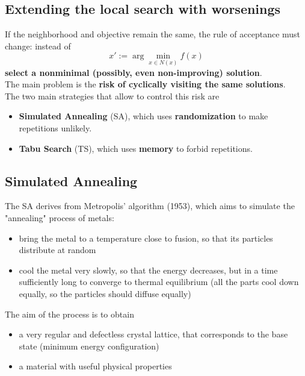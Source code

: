 \documentclass[11pt]{article}
\begin{document}
	
	\newpage
	
	\subsection{Extending the local search with worsenings}
	
	If the neighborhood and objective remain the same, the rule of acceptance must change: instead of
	$$ x' := \arg \min_{x\in N(x)} f (x) $$
	\textbf{select a nonminimal (possibly, even non-improving) solution}.\\
	
	The main problem is the \textbf{risk of cyclically visiting the same solutions}.\\
	
	The two main strategies that allow to control this risk are
	\begin{itemize}
		\item \textbf{Simulated Annealing} (SA), which uses \textbf{randomization} to make repetitions unlikely.\\
		
		\item \textbf{Tabu Search} (TS), which uses \textbf{memory} to forbid repetitions.\\
	\end{itemize}
	
	\newpage
	
	\subsection{Simulated Annealing}
	
	The SA derives from Metropolis' algorithm (1953), which aims to simulate the "annealing" process of metals:
	\begin{itemize}
		\item bring the metal to a temperature close to fusion, so that its particles distribute at random
		
		\item cool the metal very slowly, so that the energy decreases, but in a time sufficiently long to converge to thermal equilibrium (all the parts cool down equally, so the particles should diffuse equally)
	\end{itemize}
	
	The aim of the process is to obtain
	\begin{itemize}
		\item a very regular and defectless crystal lattice, that corresponds to the base state (minimum energy configuration)
		
		\item a material with useful physical properties
	\end{itemize}
	
\end{document}
